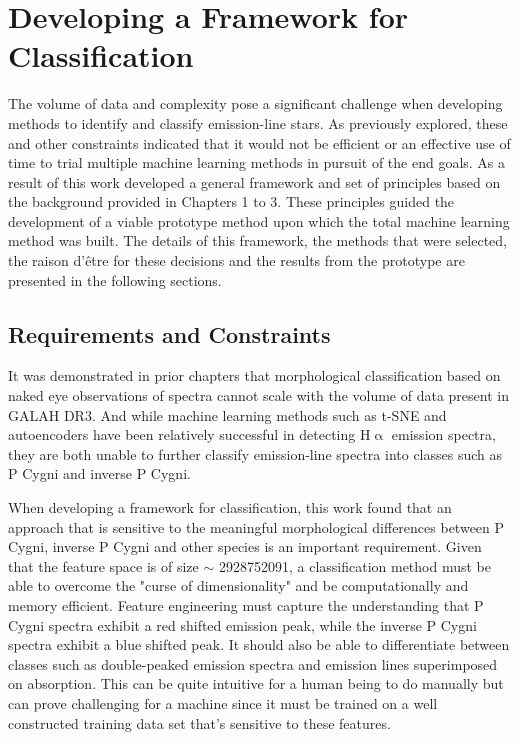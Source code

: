 \chapter{Developing a Framework for Classification}

The volume of data and complexity pose a significant challenge when developing methods to identify and classify emission-line stars. As previously explored, these and other constraints indicated that it would not be efficient or an effective use of time to trial multiple machine learning methods in pursuit of the end goals. As a result of this work developed a general framework and set of principles based on the background provided in Chapters 1 to 3. These principles guided the development of a viable prototype method upon which the total machine learning method was built. The details of this framework, the methods that were selected, the raison d'être for these decisions and the results from the prototype are presented in the following sections.

\section{Requirements and Constraints}

It was demonstrated in prior chapters that morphological classification based on naked eye observations of spectra cannot scale with the volume of data present in GALAH DR3. And while machine learning methods such as t-SNE and autoencoders \citep{traven2017galah, vcotar2021galah} have been relatively successful in detecting H$\upalpha$ emission spectra, they are both unable to further classify emission-line spectra into classes such as P Cygni and inverse P Cygni.

When developing a framework for classification, this work found that an approach that is sensitive to the meaningful morphological differences between P Cygni, inverse P Cygni and other species is an important requirement. Given that the feature space is of size $\sim$ \num[round-precision=2,round-mode=figures, scientific-notation=true]{2928752091}, a classification method must be able to overcome the "curse of dimensionality" and be computationally and memory efficient. Feature engineering must capture the understanding that P Cygni spectra exhibit a red shifted emission peak, while the inverse P Cygni spectra exhibit a blue shifted peak. It should also be able to differentiate between classes such as double-peaked emission spectra and emission lines superimposed on absorption. This can be quite intuitive for a human being to do manually but can prove challenging for a machine since it must be trained on a well constructed training data set that's sensitive to these features. 

